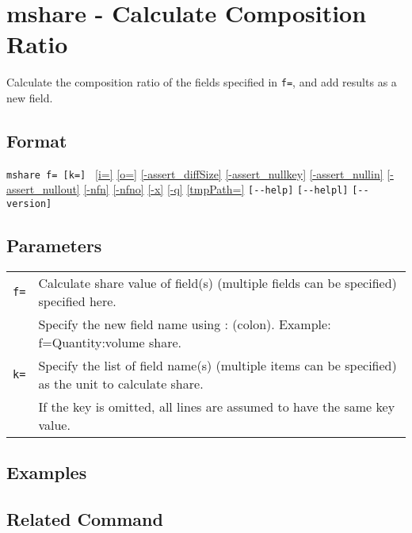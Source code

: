
%

\section{mshare - Calculate Composition Ratio\label{sect:mshare}}
Calculate the composition ratio of the fields specified in \verb|f=|, and add results as a new field.\\

\subsection*{Format}
\verb|mshare f= [k=] |
\hyperref[sect:option_i]{[i=]}
\hyperref[sect:option_o]{[o=]}
\hyperref[sect:option_assert_diffSize]{[-assert\_diffSize]}
\hyperref[sect:option_assert_nullkey]{[-assert\_nullkey]}
\hyperref[sect:option_assert_nullin]{[-assert\_nullin]}
\hyperref[sect:option_assert_nullout]{[-assert\_nullout]}
\hyperref[sect:option_nfn]{[-nfn]} 
\hyperref[sect:option_nfno]{[-nfno]}  
\hyperref[sect:option_x]{[-x]}
\hyperref[sect:option_x]{[-q]}
\hyperref[sect:option_option_tmppath]{[tmpPath=]}
\verb|[--help]|
\verb|[--helpl]|
\verb|[--version]|\\

\subsection*{Parameters}
\begin{table}[htbp]
{\small
\begin{tabular}{ll}
\verb|f=|    & Calculate share value of field(s) (multiple fields can be specified) specified here. \\
		& Specify the new field name using : (colon).  Example: f=Quantity:volume share. \\ 
\verb|k=|    & Specify the list of field name(s)  (multiple items can be specified)  as the unit to calculate share.\\
		& If the key is omitted, all lines are assumed to have the same key value. \\
\end{tabular} 
}
\end{table} 

\subsection*{Examples}

\subsection*{Related Command}

%
